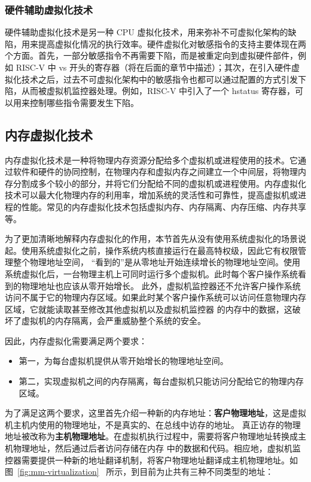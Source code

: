 \subsubsection{硬件辅助虚拟化技术} 
硬件辅助虚拟化技术是另一种 CPU 虚拟化技术，用来弥补不可虚拟化架构的缺陷，用来提高虚拟化情况的执行效率。硬件虚拟化对敏感指令的支持主要体现在两个方面。首先，一部分敏感指令不再需要下陷，而是被重定向到虚拟硬件部件，例如 RISC-V 中 vs 开头的寄存器（将在后面的章节中描述）；其次，在引入硬件虚拟化技术之后，过去不可虚拟化架构中的敏感指令也都可以通过配置的方式引发下陷，从而被虚拟机监控器处理。\cite{陈海波2019现代操作系统}例如，RISC-V 中引入了一个 hstatus 寄存器，可以用来控制哪些指令需要发生下陷。

\subsection{内存虚拟化技术}

内存虚拟化技术是一种将物理内存资源分配给多个虚拟机或进程使用的技术。它通过软件和硬件的协同控制，在物理内存和虚拟内存之间建立一个中间层，将物理内存分割成多个较小的部分，并将它们分配给不同的虚拟机或进程使用。内存虚拟化技术可以最大化物理内存的利用率，增加系统的灵活性和可靠性，提高虚拟机或进程的性能。常见的内存虚拟化技术包括虚拟内存、内存隔离、内存压缩、内存共享等。  \cite{陈海波2019现代操作系统}
  
为了更加清晰地解释内存虚拟化的作用，本节首先从没有使用系统虚拟化的场景说起。使用系统虚拟化之前，操作系统内核直接运行在最高特权级，因此它有权限管理整个物理地址空间，
“看到的”是从零地址开始连续增长的物理地址空间。使用系统虚拟化后，一台物理主机上可同时运行多个虚拟机。此时每个客户操作系统看到的物理地址也应该从零开始增长。
此外，虚拟机监控器还不允许客户操作系统访问不属于它的物理内存区域。如果此时某个客户操作系统可以访问任意物理内存区域，它就能读取甚至修改其他虚拟机以及虚拟机监控器
的内存中的数据，这破坏了虚拟机的内存隔离，会严重威胁整个系统的安全。  \cite{陈海波2019现代操作系统}
  
因此，内存虚拟化需要满足两个要求：
\begin{itemize}
    \item 第一，为每台虚拟机提供从零开始增长的物理地址空间。
    \item 第二，实现虚拟机之间的内存隔离，每台虚拟机只能访问分配给它的物理内存区域。
\end{itemize}

为了满足这两个要求，这里首先介绍一种新的内存地址：\textbf{客户物理地址}，这是虚拟机主机内使用的物理地址，不是真实的、在总线中访存的地址。
真正访存的物理地址被改称为\textbf{主机物理地址}。在虚拟机执行过程中，需要将客户物理地址转换成主机物理地址，然后通过后者访问存储在内存
中的数据和代码。相应地，虚拟机监控器需要提供一种新的地址翻译机制，将客户物理地址翻译成主机物理地址。如图~\ref{fig:mm-virtualization}~ 所示，到目前为止共有三种不同类型的地址：

